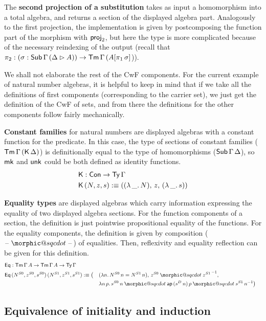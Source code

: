 \documentclass[acmsmall,review,anonymous]{acmart}\settopmatter{printfolios=true,printccs=false,printacmref=false}
\makeatletter
\DeclareRobustCommand{\sqcdot}{\mathbin{\mathpalette\morphic@sqcdot\relax}}
\newcommand{\morphic@sqcdot}[2]{%
  \sbox\z@{$\m@th#1\centerdot$}%
  \ht\z@=.33333\ht\z@
  \vcenter{\box\z@}%
}
\makeatother
\begin{document}
The \textbf{second projection of a substitution} takes as input a
homomorphism into a total algebra, and returns a section of the
displayed algebra part. Analogously to the first projection, the
implementation is given by postcomposing the function part of the
morphism with $\mathsf{proj}_2$, but here the type is more complicated because
of the necessary reindexing of the output (recall that $\pi_2 :
(\sigma:\mathsf{Sub}\,\Gamma\,(\Delta\rhd
A))\rightarrow\mathsf{Tm}\,\Gamma\,(A[\pi_1\,\sigma]$)).

We shall not elaborate the rest of the CwF components. For the current
example of natural number algebras, it is helpful to keep in mind that
if we take all the definitions of first components (corresponding to
the carrier set), we just get the definition of the CwF of sets, and
from there the definitions for the other components follow fairly
mechanically.

\textbf{Constant families} for natural numbers are displayed algebras
with a constant function for the predicate. In this case, the type of
sections of constant families ($\mathsf{Tm}\,\Gamma\,(\mathsf{K}\,\Delta)$) is
definitionally equal to the type of homomorphisms
($\mathsf{Sub}\,\Gamma\,\Delta$), so $\mathsf{mk}$ and $\mathsf{unk}$ could be both defined as
identity functions.
\begin{alignat*}{5}
  & \mathsf{K} : \mathsf{Con} \rightarrow \mathsf{Ty}\,\Gamma \\
  & \mathsf{K}\,(N, z, s) :\equiv ((\lambda\,\_.\,N),\,z,\,(\lambda\,\_.\,s))
\end{alignat*}

\textbf{Equality types} are displayed algebras which carry information
expressing the equality of two displayed algebra sections. For the
function components of a section, the definition is just pointwise
propositional equality of the functions. For the equality components,
the definition is given by composition ($\blank\sqcdot\blank$) of
equalities. Then, reflexivity and equality reflection can be given
for this definition.
\begin{alignat*}{5}
  & \Eq : \Tm\,\Gamma\,A\ra\Tm\,\Gamma\,A\ra\Ty\,\Gamma \\
  & \Eq\,(N^{S0},z^{S0},s^{S0})\,(N^{S1},z^{S1},s^{S1}) :\equiv \big( && (\lambda n.\,{N^{S0}}\,n = {N^{S1}}\,n),\,z^{S0}\sqcdot {z^{S1}}^{\,-1},\, \\
  & && \lambda n\,p.\,s^{S0}\,n\sqcdot \ap\,(s^D\,n)\,p\sqcdot s^{S1}\,n^{-1}\big)
\end{alignat*}

\subsection{Equivalence of initiality and induction}
\label{sec:initind}
\end{document}
